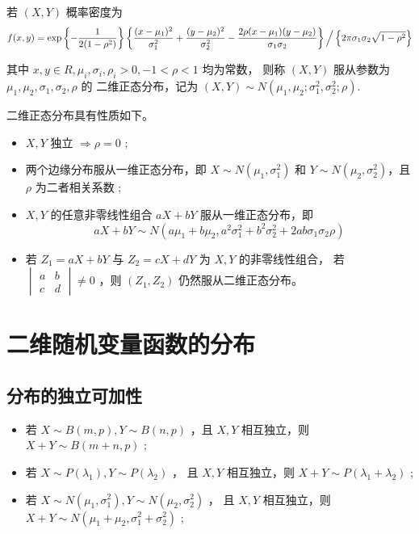 若 $ (X,Y) $ 概率密度为
$$
    f(x,y) = \exp\left\{-\dfrac{1}{2(1-\rho^2)}\right\}
    \left\{
        \dfrac{(x-\mu_1)^2}{\sigma^2_1}+
        \dfrac{(y-\mu_2)^2}{\sigma^2_2}-
        \dfrac{2\rho(x-\mu_1)(y-\mu_2)}{\sigma_1\sigma_2}
    \right\}\Big\slash\left\{
        2\pi\sigma_1\sigma_2\displaystyle\sqrt{1-\rho^2}
    \right\}
$$ 

其中 $ x,y\in R, \mu_i,\sigma_i,\rho_i > 0, -1<\rho<1 $ 均为常数，
则称 $ (X,Y) $ 服从参数为 $ \mu_1,\mu_2,\sigma_1,\sigma_2,\rho $ 的
二维正态分布，记为 $ (X,Y) \sim N(\mu_1,\mu_2;\sigma_1^2,\sigma_2^2;\rho) $.

二维正态分布具有性质如下。

\begin{itemize}
    \item $ X,Y $ 独立 $ \Rightarrow \rho = 0 $ ;
    \item 两个边缘分布服从一维正态分布，即 $ X\sim N(\mu_1,\sigma_1^2) $ 
    和 $ Y\sim N(\mu_2,\sigma_2^2) $，且$ \rho $ 为二者相关系数 ;
    \item $ X,Y $ 的任意非零线性组合 $ aX+bY $ 服从一维正态分布，即$$
        aX + bY \sim N(a\mu_1+b\mu_2,a^2\sigma_1^2 + b^2\sigma_2^2 + 2ab\sigma_1\sigma_2\rho)
    $$ 
    \item 若 $ Z_1 = aX + bY $ 与 $ Z_2 = cX + dY $ 为 $ X,Y $ 的非零线性组合，
    若 $ \begin{vmatrix}
        a&b\\c&d
    \end{vmatrix}\neq0 $ ，则 $ (Z_1,Z_2) $ 仍然服从二维正态分布。
\end{itemize}

\section{二维随机变量函数的分布}

\subsection{分布的独立可加性}

\begin{itemize}
    \item 若 $ X\sim B(m,p), Y\sim B(n,p) $ ，且 $ X,Y $ 相互独立，则 $ X+Y\sim B(m+n,p) $ ;
    \item 若 $ X\sim P(\lambda_1), Y\sim P(\lambda_2) $ ，
    且 $ X,Y $ 相互独立，则 $ X+Y\sim P(\lambda_1+\lambda_2) $ ;
    \item 若 $ X\sim N(\mu_1,\sigma_1^2), Y\sim N(\mu_2,\sigma_2^2) $ ，
    且 $ X,Y $ 相互独立，则 $ X+Y\sim N(\mu_1+\mu_2,\sigma_1^2+\sigma_2^2) $ ;
\end{itemize}

